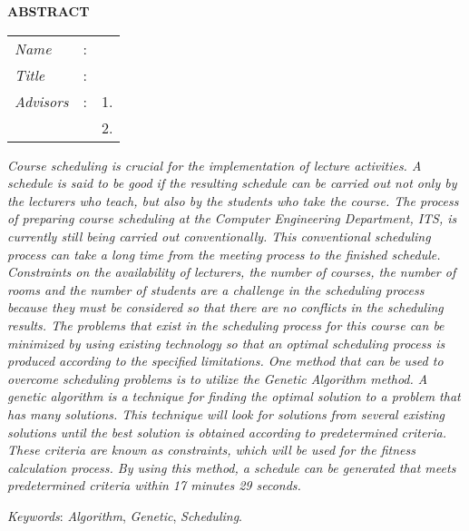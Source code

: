 \begin{center}
  \large\textbf{ABSTRACT}
  \label{chap:ABSTRACT}
\end{center}


\vspace{2ex}

\begingroup
\setlength{\tabcolsep}{0pt}

\noindent
\begin{tabularx}{\textwidth}{l >{\centering}m{3em} X}
  \emph{Name}     & : & \name{}         \\

  \emph{Title}    & : & \engtatitle{}   \\

  \emph{Advisors} & : & 1. \advisor{}   \\
                  &   & 2. \coadvisor{} \\
\end{tabularx}
\endgroup

\emph{Course scheduling is crucial for the implementation of lecture activities. 
A schedule is said to be good if the resulting schedule can be carried out not only by the lecturers who teach, but also by the students who take the course. 
The process of preparing course scheduling at the Computer Engineering Department, ITS, is currently still being carried out conventionally. 
This conventional scheduling process can take a long time from the meeting process to the finished schedule. 
Constraints on the availability of lecturers, the number of courses, the number of rooms and the number of students are a challenge in the scheduling process 
because they must be considered so that there are no conflicts in the scheduling results. The problems that exist in the scheduling process for this course 
can be minimized by using existing technology so that an optimal scheduling process is produced according to the specified limitations. 
One method that can be used to overcome scheduling problems is to utilize the Genetic Algorithm method. 
A genetic algorithm is a technique for finding the optimal solution to a problem that has many solutions. 
This technique will look for solutions from several existing solutions until the best solution is obtained according to predetermined criteria. 
These criteria are known as constraints, which will be used for the fitness calculation process. 
By using this method, a schedule can be generated that meets predetermined criteria within 17 minutes 29 seconds.}

\emph{Keywords}: \emph{Algorithm}, \emph{Genetic}, \emph{Scheduling}.

